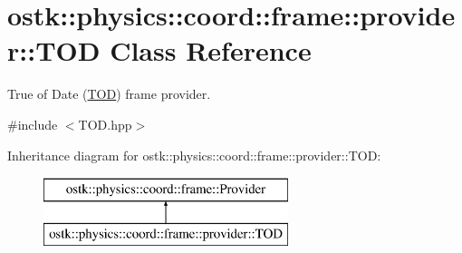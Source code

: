 \hypertarget{classostk_1_1physics_1_1coord_1_1frame_1_1provider_1_1_t_o_d}{}\section{ostk\+:\+:physics\+:\+:coord\+:\+:frame\+:\+:provider\+:\+:T\+OD Class Reference}
\label{classostk_1_1physics_1_1coord_1_1frame_1_1provider_1_1_t_o_d}


True of Date (\hyperlink{classostk_1_1physics_1_1coord_1_1frame_1_1provider_1_1_t_o_d}{T\+OD}) frame provider.  




{\ttfamily \#include $<$T\+O\+D.\+hpp$>$}

Inheritance diagram for ostk\+:\+:physics\+:\+:coord\+:\+:frame\+:\+:provider\+:\+:T\+OD\+:\begin{figure}[H]
\begin{center}
\leavevmode
\includegraphics[height=2.000000cm]{classostk_1_1physics_1_1coord_1_1frame_1_1provider_1_1_t_o_d}
\end{center}
\end{figure}
